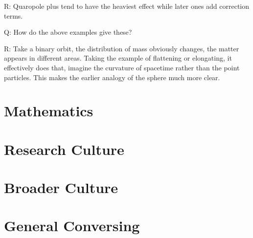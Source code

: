 R: Quaropole plus tend to have the heaviest effect while later ones add correction terms.

Q: How do the above examples give these?

R: Take a binary orbit, the distribution of mass obviously changes, the matter appears in different areas. Taking the example of flattening or elongating, it effectively does that, imagine the curvature of spacetime rather than the point particles. This makes the earlier analogy of the sphere much more clear.


\section{Mathematics}

\section{Research Culture}

\section{Broader Culture}


\section{General Conversing}



